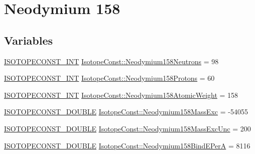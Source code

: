 \hypertarget{group___isotope_const-_neodymium-_nd158}{}\section{Neodymium 158}
\label{group___isotope_const-_neodymium-_nd158}
\subsection*{Variables}
\begin{DoxyCompactItemize}
\item 
\mbox{\hyperlink{group___isotope_const-_macros_ga5f18360b3e99483a35c32d789e62621c}{I\+S\+O\+T\+O\+P\+E\+C\+O\+N\+S\+T\+\_\+\+I\+NT}} \mbox{\hyperlink{group___isotope_const-_neodymium-_nd158_ga9699212b407b0a43c369529acd126d82}{Isotope\+Const\+::\+Neodymium158\+Neutrons}} = 98
\item 
\mbox{\hyperlink{group___isotope_const-_macros_ga5f18360b3e99483a35c32d789e62621c}{I\+S\+O\+T\+O\+P\+E\+C\+O\+N\+S\+T\+\_\+\+I\+NT}} \mbox{\hyperlink{group___isotope_const-_neodymium-_nd158_gaa19f417c01f951d826f9e99a42604c4d}{Isotope\+Const\+::\+Neodymium158\+Protons}} = 60
\item 
\mbox{\hyperlink{group___isotope_const-_macros_ga5f18360b3e99483a35c32d789e62621c}{I\+S\+O\+T\+O\+P\+E\+C\+O\+N\+S\+T\+\_\+\+I\+NT}} \mbox{\hyperlink{group___isotope_const-_neodymium-_nd158_ga3ea46ff2fe60fa5356086d4018df4b47}{Isotope\+Const\+::\+Neodymium158\+Atomic\+Weight}} = 158
\item 
\mbox{\hyperlink{group___isotope_const-_macros_ga8f45a7272ce02c0b4c65c44636ed719a}{I\+S\+O\+T\+O\+P\+E\+C\+O\+N\+S\+T\+\_\+\+D\+O\+U\+B\+LE}} \mbox{\hyperlink{group___isotope_const-_neodymium-_nd158_gae9c86eccd9f131babc60414c29d11e49}{Isotope\+Const\+::\+Neodymium158\+Mass\+Exc}} = -\/54055
\item 
\mbox{\hyperlink{group___isotope_const-_macros_ga8f45a7272ce02c0b4c65c44636ed719a}{I\+S\+O\+T\+O\+P\+E\+C\+O\+N\+S\+T\+\_\+\+D\+O\+U\+B\+LE}} \mbox{\hyperlink{group___isotope_const-_neodymium-_nd158_ga2c62a0178d56870de3a2e540a2328ed3}{Isotope\+Const\+::\+Neodymium158\+Mass\+Exc\+Unc}} = 200
\item 
\mbox{\hyperlink{group___isotope_const-_macros_ga8f45a7272ce02c0b4c65c44636ed719a}{I\+S\+O\+T\+O\+P\+E\+C\+O\+N\+S\+T\+\_\+\+D\+O\+U\+B\+LE}} \mbox{\hyperlink{group___isotope_const-_neodymium-_nd158_gaae38c27ab175224f2478e4d6b5dd493e}{Isotope\+Const\+::\+Neodymium158\+Bind\+E\+PerA}} = 8116
\item 

\end{DoxyCompactItemize}
